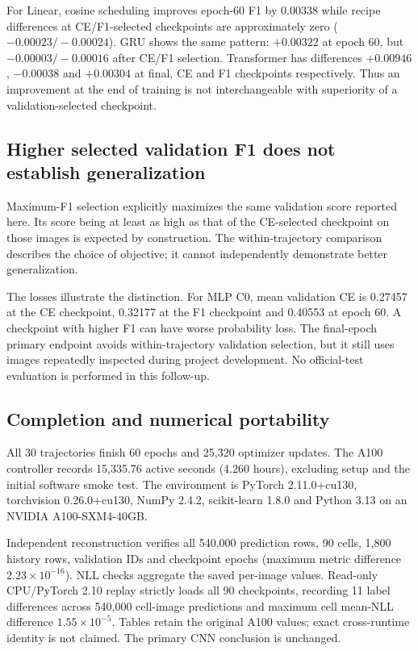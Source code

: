 For Linear, cosine scheduling improves epoch-60 F1 by 0.00338 while recipe differences at CE/F1-selected checkpoints are approximately zero ($-0.00023/-0.00024$). GRU shows the same pattern: $+0.00322$ at epoch 60, but $-0.00003/-0.00016$ after CE/F1 selection. Transformer has differences $+0.00946$, $-0.00038$ and $+0.00304$ at final, CE and F1 checkpoints respectively. Thus an improvement at the end of training is not interchangeable with superiority of a validation-selected checkpoint.

\subsection{Higher selected validation F1 does not establish generalization}
Maximum-F1 selection explicitly maximizes the same validation score reported here. Its score being at least as high as that of the CE-selected checkpoint on those images is expected by construction. The within-trajectory comparison describes the choice of objective; it cannot independently demonstrate better generalization.

The losses illustrate the distinction. For MLP C0, mean validation CE is 0.27457 at the CE checkpoint, 0.32177 at the F1 checkpoint and 0.40553 at epoch 60. A checkpoint with higher F1 can have worse probability loss. The final-epoch primary endpoint avoids within-trajectory validation selection, but it still uses images repeatedly inspected during project development. No official-test evaluation is performed in this follow-up.

\subsection{Completion and numerical portability}
All 30 trajectories finish 60 epochs and 25,320 optimizer updates. The A100 controller records 15,335.76 active seconds (4.260 hours), excluding setup and the initial software smoke test. The environment is PyTorch 2.11.0+cu130, torchvision 0.26.0+cu130, NumPy 2.4.2, scikit-learn 1.8.0 and Python 3.13 on an NVIDIA A100-SXM4-40GB.

Independent reconstruction verifies all 540,000 prediction rows, 90 cells, 1,800 history rows, validation IDs and checkpoint epochs (maximum metric difference $2.23\times10^{-16}$). NLL checks aggregate the saved per-image values. Read-only CPU/PyTorch 2.10 replay strictly loads all 90 checkpoints, recording 11 label differences across 540,000 cell-image predictions and maximum cell mean-NLL difference $1.55\times10^{-5}$. Tables retain the original A100 values; exact cross-runtime identity is not claimed. The primary CNN conclusion is unchanged.

